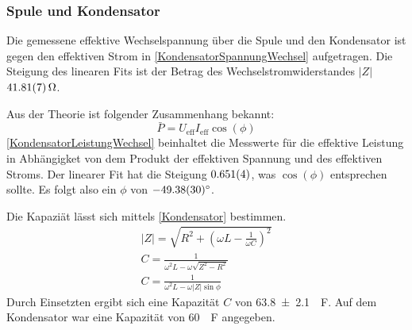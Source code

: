 \documentclass[
	a4paper,
	12pt,
	pagesize,
	ngerman
]{scrartcl}
\begin{document}
	\subsubsection*{Spule und Kondensator}
	Die gemessene effektive Wechselspannung über die Spule und den Kondensator ist gegen den effektiven Strom in \cref{KondensatorSpannungWechsel} aufgetragen.
	Die Steigung des linearen Fits ist der Betrag des Wechselstromwiderstandes $|Z|$ $\SI{41,81 \pm 0,07}{\Omega}$. 

	Aus der Theorie ist folgender Zusammenhang bekannt:
	\begin{equation}
		\bar{P} = U_\text{eff} I_\text{eff} \cos(\phi)
	\end{equation}
	\cref{KondensatorLeistungWechsel} beinhaltet die Messwerte für die effektive Leistung in Abhängigket von dem Produkt der effektiven Spannung und des effektiven Stroms. 
	Der linearer Fit hat die Steigung $\SI{0,651 \pm 0,004}{}$, was $\cos(\phi)$ entsprechen sollte. 
	Es folgt also ein $\phi$ von $-\ang{49,38 \pm 0,30}$.

	Die Kapaziät lässt sich mittels \cref{Kondensator} bestimmen.
	\begin{gather}
		\label{Kondensator}
		|Z| = \sqrt{R^2 + (\omega L - \frac{1}{\omega C})^2} \\
		C = \frac{1}{\omega^2 L- \omega\sqrt{Z^2-R^2}} \\
		C = \frac{1}{\omega^2 L- \omega|Z|\sin{\phi}} 
	\end{gather}
	Durch Einsetzten ergibt sich eine Kapazität $C$ von \SI{63,8 \pm 2,1}{\mu F}. Auf dem Kondensator war eine Kapazität von \SI{60}{\mu F} angegeben.
\end{document}
